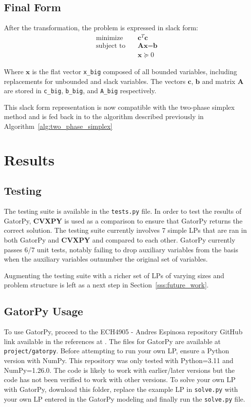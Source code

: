 \documentclass[conference]{IEEEtran}
\begin{document}
\subsection{Final Form}

After the transformation, the problem is expressed in slack form:
\begin{align*}
\text{minimize} \quad & \textbf{c}^T \textbf{c} \\
\text{subject to} \quad & \textbf{A} \textbf{x} = \textbf{b} \\
& \textbf{x} \succeq 0
\end{align*}

Where $\textbf{x}$ is the flat vector \texttt{x\_big} composed of all bounded variables, including replacements for unbounded and slack variables. 
The vectors $\textbf{c}$, $\textbf{b}$ and matrix $\textbf{A}$ are stored in \texttt{c\_big}, \texttt{b\_big}, and \texttt{A\_big} respectively.

This slack form representation is now compatible with the two-phase simplex method and is fed back in to the algorithm described previously in Algorithm~\ref{alg:two_phase_simplex}

\section{Results}
\label{sse:results}
\subsection{Testing}
The testing suite is available in the \texttt{tests.py} file.
In order to test the results of GatorPy, \textbf{CVXPY} is used as a comparison to ensure that GatorPy returns the correct solution.
The testing suite currently involves 7 simple LPs that are ran in both GatorPy and \textbf{CVXPY} and compared to each other.
GatorPy currently passes 6/7 unit tests, notably failing to drop auxiliary variables from the basis when the auxiliary variables outnumber the original set of variables.

Augmenting the testing suite with a richer set of LPs of varying sizes and problem structure is left as a next step in Section~\ref{sss:future_work}.
\subsection{GatorPy Usage}
To use GatorPy, proceed to the ECH4905 - Andres Espinosa repository GitHub link available in the references at \cite{repo:ech4905}.
The files for GatorPy are available at \texttt{project/gatorpy}.
Before attempting to run your own LP, ensure a Python version with NumPy.
This repository was only tested with Python=3.11 and NumPy=1.26.0.
The code is likely to work with earlier/later versions but the code has not been verified to work with other versions.
To solve your own LP with GatorPy, download this folder, replace the example LP in \texttt{solve.py} with your own LP entered in the GatorPy modeling and finally run the \texttt{solve.py} file.
\end{document}
